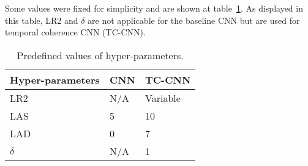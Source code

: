 Some values were fixed for simplicity and are shown at table~\ref{tab:hyperparamsvals}. As displayed in this table, LR2 and $\delta$ are not applicable for the baseline CNN but are used for temporal coherence CNN (TC-CNN).


\begin{table}[ht]
\label{tab:hyperparamsvals}
\begin{center}
\begin{tabular}{lll}

Hyper-parameters & CNN & TC-CNN \\ 
\midrule
LR2 & N/A & Variable \\ 

LAS & 5 & 10 \\ 

LAD & 0 & 7 \\ 

$\delta$ & N/A & 1 \\
\bottomrule
\end{tabular} 
\caption{Predefined values of hyper-parameters.}
\end{center}
\end{table}


